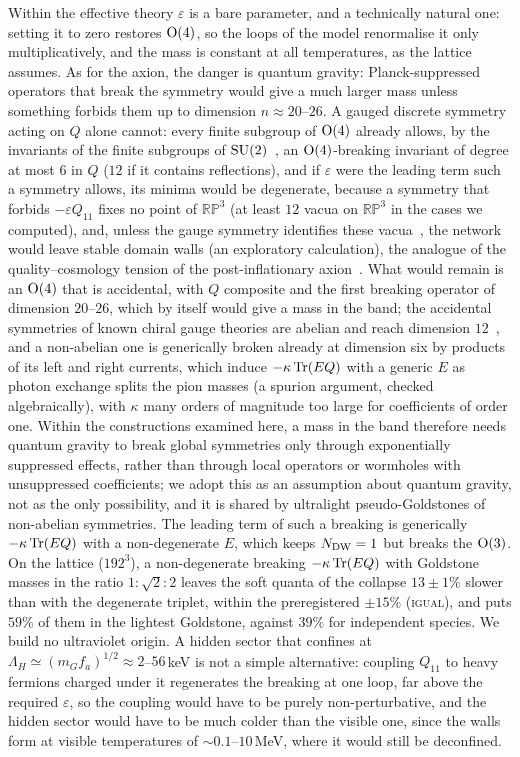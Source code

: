 \documentclass[11pt,a4paper]{article}
\newcommand{\RP}{\mathbb{RP}^3}
\begin{document}
Within the effective theory $\varepsilon$ is a bare parameter, and a technically natural one: setting it to zero restores ${\rm O}(4)$, so the loops of the model renormalise it only multiplicatively, and the mass is constant at all temperatures, as the lattice assumes. As for the axion, the danger is quantum gravity: Planck-suppressed operators that break the symmetry would give a much larger mass unless something forbids them up to dimension $n\approx20$--$26$. A gauged discrete symmetry acting on $Q$ alone cannot: every finite subgroup of ${\rm O}(4)$ already allows, by the invariants of the finite subgroups of ${\rm SU}(2)$~\cite{ConwaySmith2003}, an ${\rm O}(4)$-breaking invariant of degree at most $6$ in $Q$ ($12$ if it contains reflections), and if $\varepsilon$ were the leading term such a symmetry allows, its minima would be degenerate, because a symmetry that forbids $-\varepsilon Q_{11}$ fixes no point of $\RP$ (at least $12$ vacua on $\RP$ in the cases we computed), and, unless the gauge symmetry identifies these vacua~\cite{LazaridesShafi1982}, the network would leave stable domain walls (an exploratory calculation), the analogue of the quality--cosmology tension of the post-inflationary axion~\cite{LuReeceSun2023}. What would remain is an ${\rm O}(4)$ that is accidental, with $Q$ composite and the first breaking operator of dimension $20$--$26$, which by itself would give a mass in the band; the accidental symmetries of known chiral gauge theories are abelian and reach dimension $12$~\cite{ContinoPodoRevello2022}, and a non-abelian one is generically broken already at dimension six by products of its left and right currents, which induce $-\kappa\,{\rm Tr}(EQ)$ with a generic $E$ as photon exchange splits the pion masses (a spurion argument, checked algebraically), with $\kappa$ many orders of magnitude too large for coefficients of order one. Within the constructions examined here, a mass in the band therefore needs quantum gravity to break global symmetries only through exponentially suppressed effects, rather than through local operators or wormholes with unsuppressed coefficients; we adopt this as an assumption about quantum gravity, not as the only possibility, and it is shared by ultralight pseudo-Goldstones of non-abelian symmetries. The leading term of such a breaking is generically $-\kappa\,{\rm Tr}(EQ)$ with a non-degenerate $E$, which keeps $N_{\rm DW}=1$ but breaks the ${\rm O}(3)$. On the lattice ($192^3$), a non-degenerate breaking $-\kappa\,{\rm Tr}(EQ)$ with Goldstone masses in the ratio $1:\sqrt2:2$ leaves the soft quanta of the collapse $13\pm1\%$ slower than with the degenerate triplet, within the preregistered $\pm15\%$ (\textsc{igual}), and puts $59\%$ of them in the lightest Goldstone, against $39\%$ for independent species. We build no ultraviolet origin. A hidden sector that confines at $\Lambda_H\simeq(m_Gf_a)^{1/2}\approx2$--$56$\,keV is not a simple alternative: coupling $Q_{11}$ to heavy fermions charged under it regenerates the breaking at one loop, far above the required $\varepsilon$, so the coupling would have to be purely non-perturbative, and the hidden sector would have to be much colder than the visible one, since the walls form at visible temperatures of $\sim0.1$--$10$\,MeV, where it would still be deconfined.
\end{document}
